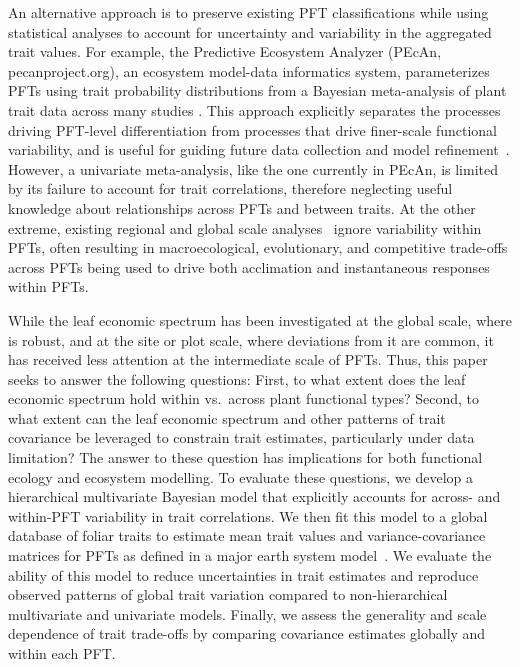 An alternative approach is to preserve existing PFT classifications%
\cite[though potentially with finer taxonomic, functional, or spatial resolution, e.g.]{boulangeat_improving_2012}
while using statistical analyses to account for uncertainty and variability in the aggregated trait values.
For example, the Predictive Ecosystem Analyzer (PEcAn, pecanproject.org), an ecosystem model-data informatics system, parameterizes PFTs using trait probability distributions from a Bayesian meta-analysis of plant trait data across many studies%
\cite{dietze_improving_2013,lebauer_facilitating_2013}.
This approach explicitly separates the processes driving PFT-level differentiation from processes that drive finer-scale functional variability,
and is useful for guiding future data collection and model refinement~\cite{dietze_quantitative_2014}.
However, a univariate meta-analysis, like the one currently in PEcAn, is limited by its failure to account for trait correlations, therefore neglecting useful knowledge about relationships across PFTs and between traits.
At the other extreme, existing regional and global scale analyses~\cite[e.g.]{van_bodegom_going_2012,sakschewski_leaf_2015} ignore variability within PFTs, often resulting in macroecological, evolutionary, and competitive trade-offs across PFTs being used to drive both acclimation and instantaneous responses within PFTs.

While the leaf economic spectrum has been investigated at the global scale, where is robust, and at the site or plot scale, where deviations from it are common, it has received less attention at the intermediate scale of PFTs.
Thus, this paper seeks to answer the following questions:
First, to what extent does the leaf economic spectrum hold within vs.\ across plant functional types?
Second, to what extent can the leaf economic spectrum and other patterns of trait covariance be leveraged to constrain trait estimates, particularly under data limitation?
The answer to these question has implications for both functional ecology and ecosystem modelling.
To evaluate these questions, we develop a hierarchical multivariate Bayesian model that explicitly accounts for across- and within-PFT variability in trait correlations.
We then fit this model to a global database of foliar traits to estimate mean trait values and variance-covariance matrices for PFTs as defined in a major earth system model~\cite[Community Land Model, CLM,]{clm45_note}.
We evaluate the ability of this model to reduce uncertainties in trait estimates and reproduce observed patterns of global trait variation compared to non-hierarchical multivariate and univariate models.
Finally, we assess the generality and scale dependence of trait trade-offs by comparing covariance estimates globally and within each PFT\@.
